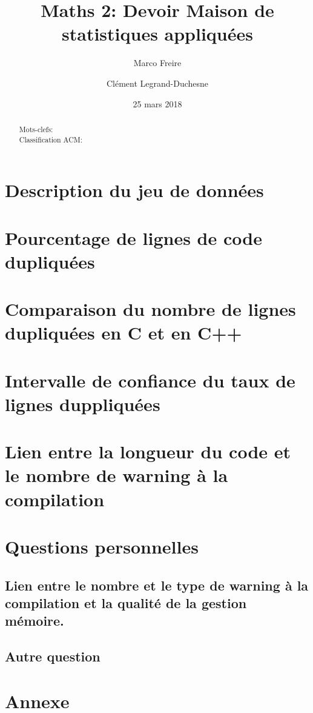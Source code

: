 \documentclass[a4paper,11pt]{article}%
\begin{document}
\title{Maths 2: Devoir Maison de statistiques appliquées}

\author{Marco Freire \and Clément Legrand-Duchesne}

\date{25 mars 2018}

\maketitle

\begin{abstract}
  
  \begin{description}
    
  \item[Mots-clefs:] 
      
  \item[Classification ACM:] 
  \end{description}
\end{abstract}

\renewcommand{\contentsname}{Plan}
\tableofcontents

\section{Description du jeu de données}


\section{Pourcentage de lignes de code dupliquées}


\section{Comparaison du nombre de lignes dupliquées en C et en C++}


\section{Intervalle de confiance du taux de lignes duppliquées}


\section{Lien entre la longueur du code et le nombre de warning à la
  compilation}


\section{Questions personnelles}
\subsection{Lien entre le nombre et le type de warning à la
  compilation et la qualité de la gestion mémoire.}

\subsection{Autre question}


\section*{Annexe}

\end{document}

